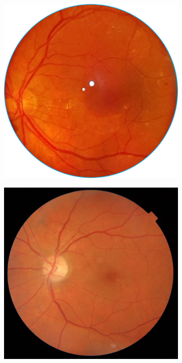 \begin{figure}[!t]
\centering

\begin{subfigure}[t]{0.3\textwidth}
  \includegraphics[width=\textwidth]{img/samsung.png}
\end{subfigure}
\begin{subfigure}[t]{0.3\textwidth}
  \includegraphics[width=\textwidth]{img/OCT.jpg}

\end{subfigure}
\end{figure}
